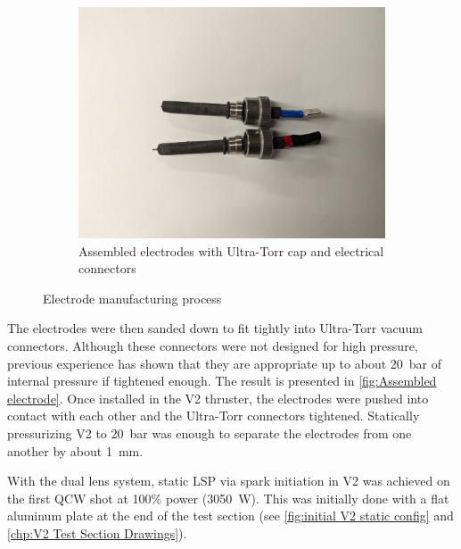\begin{figure}[!ht]
\begin{subfigure}[t]{0.30\textwidth}
        \centering
        \includegraphics[width=\textwidth]{assets/3 design/V2 electrodes.jpg}
        \caption{Assembled electrodes with Ultra-Torr cap and electrical connectors}
        \label{fig:Assembled electrode}
    \end{subfigure}

    \caption{Electrode manufacturing process}
\end{figure}

The electrodes were then sanded down to fit tightly into Ultra-Torr vacuum connectors. Although these connectors were not designed for high pressure, previous experience has shown that they are appropriate up to about \qty{20}{bar} of internal pressure if tightened enough. The result is presented in \autoref{fig:Assembled electrode}. Once installed in the V2 thruster, the electrodes were pushed into contact with each other and the Ultra-Torr connectors tightened. Statically pressurizing V2 to \qty{20}{bar} was enough to separate the electrodes from one another by about \qty{1}{mm}.

With the dual lens system, static LSP via spark initiation in V2 was achieved on the first QCW shot at 100\% power (\qty{3050}{W}). This was initially done with a flat aluminum plate at the end of the test section (see \autoref{fig:initial V2 static config} and \autoref{chp:V2 Test Section Drawings}). 

